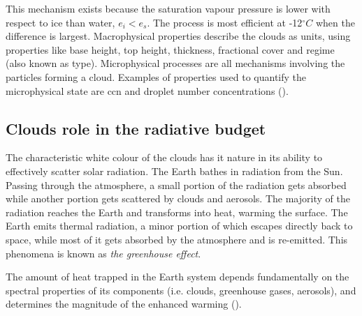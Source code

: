 This mechanism exists because the saturation vapour pressure is lower with respect to ice than water, $e_i < e_s$. The process is most efficient at -12$^{\circ}C$ when the difference is largest. Macrophysical properties describe the clouds as units, using properties like base height, top height, thickness, fractional cover and regime (also known as type). Microphysical processes are all mechanisms involving the particles forming a cloud. Examples of properties used to quantify the microphysical state
are \acrshort{ccn} and droplet number concentrations (\cite{Grabowski2019ModelingBetter}).

\subsection{Clouds role in the radiative budget}
The characteristic white colour of the clouds has it nature in its ability to  effectively scatter solar radiation. %
The Earth bathes in radiation from the Sun. Passing through the atmosphere, a small portion of the radiation gets absorbed while another portion gets scattered by clouds and aerosols. The majority of the radiation reaches the Earth and transforms into heat, warming the surface. The Earth emits thermal radiation, a minor portion of which escapes directly back to space, while most of it gets absorbed by the atmosphere and is re-emitted. This phenomena is known as \textit{the greenhouse effect}. 

The amount of heat trapped in the Earth system depends fundamentally on the spectral properties of its components (i.e. clouds, greenhouse gases, aerosols), and determines the magnitude of the enhanced warming (\cite{greenhouse_effect}).

